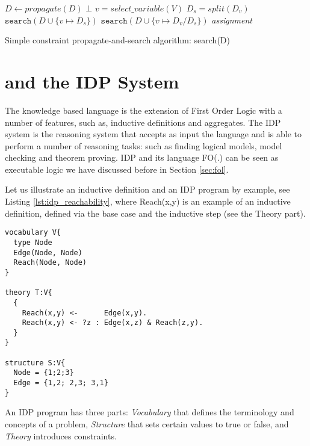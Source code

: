 \begin{algorithm}[t]
    \begin{algorithmic}[1]
        \footnotesize
        \State $D \gets \textit{propagate}(D)$
        \State \Return $\bot$
        \EndIf
        \State $v = \textit{select\_variable}(V)$ 
        \State $D_s = \textit{split}(D_v)$  
        \State $\texttt{search}(D \cup \{ v \mapsto D_s \})$ 
        \State $\texttt{search}(D \cup \{ v \mapsto D_v / D_s \})$
        \Else
        \State \Return \textit{assignment}
        \EndIf
    \end{algorithmic}
    \caption{Simple constraint propagate-and-search algorithm: search(D)}
    \label{algo:simple_search}
\end{algorithm}

\section{\fod and the IDP System}
The knowledge based language \fod is the extension of First Order Logic with a number of features, such as, inductive definitions and aggregates. The IDP system \parencite{idppaper} is the reasoning system that accepts as input the \fod language and is able to perform a number of reasoning tasks: such as finding logical models, model checking and theorem proving. IDP and its language FO(.) can be seen as executable logic we have discussed before in Section \ref{sec:fol}. 

Let us illustrate an inductive definition and an IDP program by example, see Listing \ref{lst:idp_reachability}, where Reach(x,y) is an example of an inductive definition, defined via the base case and the inductive step (see the Theory part).
\begin{lstlisting}[caption=An example of an inductive definition in FO(.) and of an IDP program,label=lst:idp_reachability]
vocabulary V{
  type Node
  Edge(Node, Node)
  Reach(Node, Node)
}

theory T:V{
  { 
    Reach(x,y) <-      Edge(x,y).
    Reach(x,y) <- ?z : Edge(x,z) & Reach(z,y).
  }
}

structure S:V{
  Node = {1;2;3}
  Edge = {1,2; 2,3; 3,1} 
}
\end{lstlisting}

An IDP program has three parts: \textit{Vocabulary} that defines the terminology and concepts of a problem, \textit{Structure} that sets certain values to true or false, and \textit{Theory} introduces constraints.

